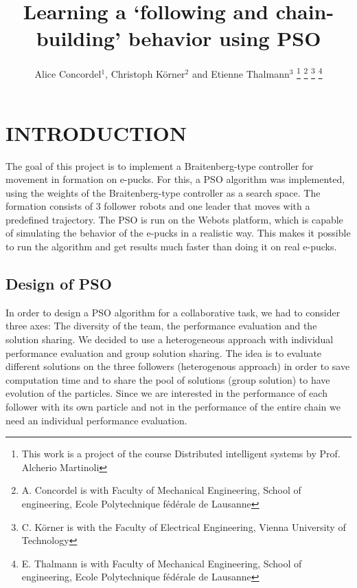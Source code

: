 \documentclass[a4, 10 pt, conference]{ieeeconf}  %
\title{\LARGE \bf
Learning a ‘following and chain-building’ behavior using PSO
}
\author{Alice Concordel$^{1}$, Christoph K\"{o}rner$^{2}$ and Etienne Thalmann$^{3}$%
\thanks{This work is a project of the course Distributed intelligent systems by Prof. Alcherio Martinoli}%
\thanks{A. Concordel is with Faculty of Mechanical Engineering, School of engineering, Ecole Polytechnique fédérale de Lausanne}
\thanks{C. K\"{o}rner is with the Faculty of Electrical Engineering, Vienna University of Technology} %
\thanks{E. Thalmann is with Faculty of Mechanical Engineering, School of engineering, Ecole Polytechnique fédérale de Lausanne}%
}
\begin{document}
\maketitle
\thispagestyle{empty}
\pagestyle{empty}


\begin{abstract}


\end{abstract}


\section{INTRODUCTION}
The goal of this project is to implement a Braitenberg-type controller for movement in formation on e-pucks. For this, a PSO algorithm was implemented, using the weights of the Braitenberg-type controller as a search space. The formation consists of 3 follower robots and one leader that moves with a predefined trajectory. The PSO is run on the Webots platform, which is capable of simulating the behavior of the e-pucks in a realistic way. This makes it possible to run the algorithm and get results much faster than doing it on real e-pucks.

\subsection{Design of PSO}
In order to design a PSO algorithm for a collaborative task, we had to consider three axes: The diversity of the team, the performance evaluation and the solution sharing. We decided  to use a heterogeneous approach with individual performance evaluation and group solution sharing. The idea is to evaluate different solutions on the three followers (heterogenous approach) in order to save computation time and to share the pool of solutions (group solution) to have evolution of the particles. Since we are interested in the performance of each follower with its own particle and not in the performance of the entire chain we need an individual performance evaluation.
\end{document}
